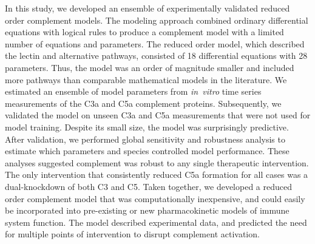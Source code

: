 \documentclass[12pt]{article}
\begin{document}
In this study, we developed an ensemble of experimentally validated reduced order complement models.
The modeling approach combined ordinary differential equations with logical rules to produce a complement model with a limited number of equations and parameters.
The reduced order model,  which described the lectin and alternative pathways, consisted of 18 differential equations with 28 parameters.
Thus, the model was an order of magnitude smaller and included more pathways than comparable mathematical models in the literature.
We estimated an ensemble of model parameters from \textit{in~vitro} time series measurements of the C3a and C5a complement proteins.
Subsequently, we validated the model on unseen C3a and C5a measurements that were not used for model training.
Despite its small size, the model was surprisingly predictive.
After validation, we performed global sensitivity and robustness analysis to estimate which parameters and species
controlled model performance. These analyses suggested complement was robust to any single therapeutic intervention.
The only intervention that consistently reduced C5a formation for all cases was a dual-knockdown of both C3 and C5.
Taken together, we developed a reduced order complement model that was computationally inexpensive,
and could easily be incorporated into pre-existing or new pharmacokinetic models of immune system function.
The model described experimental data, and predicted the need for multiple points of intervention to disrupt complement activation.
\end{document}
